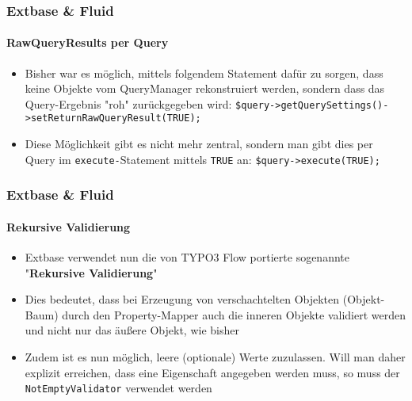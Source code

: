 
\begin{frame}[fragile]
	\frametitle{Extbase \& Fluid}
	\framesubtitle{RawQueryResults per Query}

	\lstset{
		basicstyle=\smaller\ttfamily
	}

	\begin{itemize}
		\item Bisher war es möglich, mittels folgendem Statement dafür zu sorgen,
			dass keine Objekte vom QueryManager rekonstruiert werden, sondern
			dass das Query-Ergebnis "roh" zurückgegeben wird:\newline
			\lstinline!$query->getQuerySettings()->setReturnRawQueryResult(TRUE);!
			\newline
		\item Diese Möglichkeit gibt es nicht mehr zentral, sondern man gibt dies
			per Query im \texttt{execute-}Statement mittels \texttt{TRUE} an:\newline
			\lstinline!$query->execute(TRUE);!

	\end{itemize}

\end{frame}


\begin{frame}[fragile]
	\frametitle{Extbase \& Fluid}
	\framesubtitle{Rekursive Validierung}

	\begin{itemize}
		\item Extbase verwendet nun die von TYPO3 Flow portierte sogenannte
			"\textbf{Rekursive Validierung}"
		\item Dies bedeutet, dass bei Erzeugung von verschachtelten Objekten
			(Objekt-Baum) durch den Property-Mapper auch die inneren Objekte
			validiert werden und nicht nur das äußere Objekt, wie bisher
		\item Zudem ist es nun möglich, leere (optionale) Werte zuzulassen.
			Will man daher explizit erreichen, dass eine Eigenschaft angegeben
			werden muss, so muss der \texttt{NotEmptyValidator} verwendet werden

	\end{itemize}

	\breakingchange

\end{frame}

